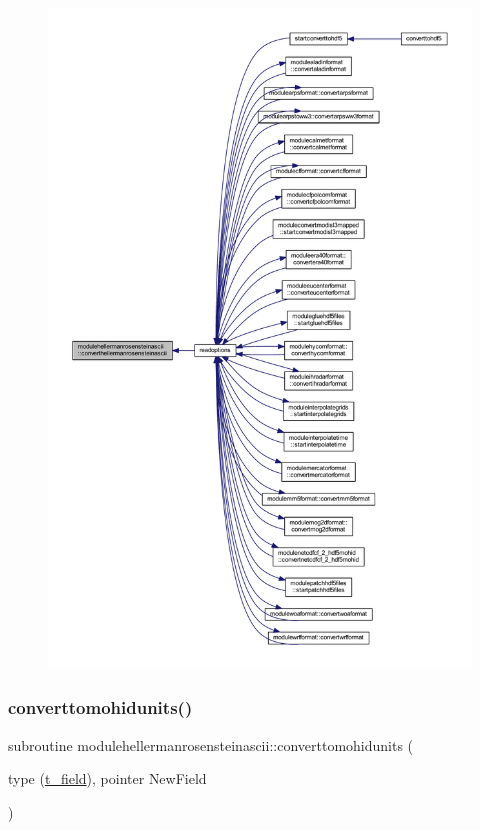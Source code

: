 \begin{figure}[H]
\begin{center}
\leavevmode
\includegraphics[width=350pt]{namespacemodulehellermanrosensteinascii_ae9a4ebb5ba70b59aa745588ca89b7a95_icgraph}
\end{center}
\end{figure}
\mbox{\label{namespacemodulehellermanrosensteinascii_a8d26b87c5c59b45954adf68b0ada3545}} 
\subsubsection{\texorpdfstring{converttomohidunits()}{converttomohidunits()}}
{\footnotesize\ttfamily subroutine modulehellermanrosensteinascii\+::converttomohidunits (\begin{DoxyParamCaption}\item[{type (\mbox{\hyperlink{structmodulehellermanrosensteinascii_1_1t__field}{t\+\_\+field}}), pointer}]{New\+Field }\end{DoxyParamCaption})\hspace{0.3cm}{\ttfamily [private]}}

